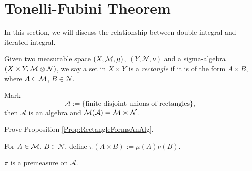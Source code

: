 \section{Tonelli-Fubini Theorem}
\begin{rem}
    In this section, we will discuss the relationship between 
    double integral and iterated integral.
\end{rem}
\begin{defn}
    \label{Defn:Rectangle}
    Given two measurable space $(X,\mathcal{M},\mu)$, $(Y,\mathcal{N},\nu)$ 
    and a sigma-algebra $(X\times Y,\mathcal{M}\otimes\mathcal{N})$, we say 
    a set in $X\times Y$ is a \textit{rectangle} if it is of 
    the form $A\times B$, where $A\in\mathcal{M}$, $B\in\mathcal{N}$.
\end{defn}
\begin{prop}
    \label{Prop:RectangleFormsAnAlg}
    Mark 
    \begin{displaymath}
    \mathcal{A}:=\{\text{finite disjoint unions of rectangles}\},
    \end{displaymath} 
    then $\mathcal{A}$ is an algebra and 
    $\mathcal{M}(\mathcal{A})=\mathcal{M}\times\mathcal{N}$.
\end{prop}
\begin{exc}
    Prove Proposition \ref{Prop:RectangleFormsAnAlg}.
\end{exc}
\begin{defn}
    \label{Defn:PremeasureOnA}
    For $A\in\mathcal{M}$, $B\in\mathcal{N}$, define 
    $\pi(A\times B):=\mu(A)\nu(B)$.
\end{defn}
\begin{prop}
    \label{Prop:PiIsAPremeas}
    $\pi$ is a premeasure on $\mathcal{A}$.
\end{prop}
